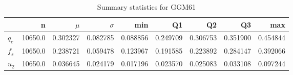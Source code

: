 \begin{table}[h]
\caption{Summary statistics for GGM61}
\begin{tabular}{lrrrrrrrr}
\toprule
{} &        n &     $\mu$ &  $\sigma$ &       min &        Q1 &        Q2 &        Q3 &       max \\
\midrule
$q_c$ &  10650.0 &  0.302327 &  0.082785 &  0.088856 &  0.249709 &  0.306753 &  0.351900 &  0.454844 \\
$f_s$ &  10650.0 &  0.238721 &  0.059478 &  0.123967 &  0.191585 &  0.223892 &  0.284147 &  0.392066 \\
$u_2$ &  10650.0 &  0.036645 &  0.024179 &  0.017196 &  0.023570 &  0.025083 &  0.033108 &  0.097244 \\
\bottomrule
\end{tabular}
\end{table}

